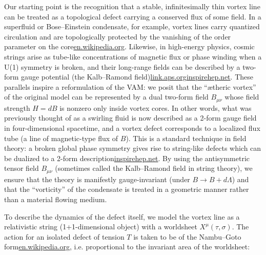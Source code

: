 \documentclass[12pt]{article}
\begin{document}
Our starting point is the recognition that a stable, infinitesimally thin vortex line can be treated as a topological defect carrying a conserved flux of some field. In a superfluid or Bose–Einstein condensate, for example, vortex lines carry quantized circulation and are topologically protected by the vanishing of the order parameter on the core\href{https://en.wikipedia.org/wiki/Vortex_ring#:~:text=The%20resulting%20circulation%20Image%3A%20,frac%20%7B7%7D%7B4%7D%7D%5Cright%29%5Cend%7Baligned}{en.wikipedia.org}. Likewise, in high-energy physics, cosmic strings arise as tube-like concentrations of magnetic flux or phase winding when a U(1) symmetry is broken, and their long-range fields can be described by a two-form gauge potential (the Kalb–Ramond field)\href{https://link.aps.org/doi/10.1103/PhysRevD.9.2273#:~:text=Classical%20direct%20interstring%20action,2273}{link.aps.org}\href{https://inspirehep.net/literature/124332#:~:text=,2284.%20%E2%80%A2.%20DOI%3A%2010.1103%2FPhysRevD.9.2273}{inspirehep.net}. These parallels inspire a reformulation of the VAM: we posit that the “ætheric vortex” of the original model can be represented by a dual two-form field $B_{\mu\nu}$ whose field strength $H=dB$ is nonzero only inside vortex cores. In other words, what was previously thought of as a swirling fluid is now described as a 2-form gauge field in four-dimensional spacetime, and a vortex defect corresponds to a localized flux tube (a line of magnetic-type flux of $B$). This is a standard technique in field theory: a broken global phase symmetry gives rise to string-like defects which can be dualized to a 2-form description\href{https://inspirehep.net/literature/88993#:~:text=Classical%20direct%20interstring%20action,2284.%20DOI}{inspirehep.net}. By using the antisymmetric tensor field $B_{\mu\nu}$ (sometimes called the Kalb–Ramond field in string theory), we ensure that the theory is manifestly gauge-invariant (under $B \to B + d\Lambda$) and that the “vorticity” of the condensate is treated in a geometric manner rather than a material flowing medium.


To describe the dynamics of the defect itself, we model the vortex line as a relativistic string (1+1-dimensional object) with a worldsheet $X^\mu(\tau,\sigma)$. The action for an isolated defect of tension $T$ is taken to be of the Nambu–Goto form\href{https://en.wikipedia.org/wiki/Vortex_ring#:~:text=51.%20,On%20a%20spherical%20vortex}{en.wikipedia.org}, i.e. proportional to the invariant area of the worldsheet:
\end{document}
